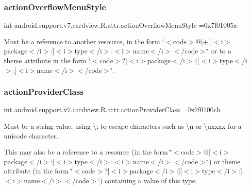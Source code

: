 \subsubsection{\texorpdfstring{action\+Overflow\+Menu\+Style}{actionOverflowMenuStyle}}
{\footnotesize\ttfamily int android.\+support.\+v7.\+cardview.\+R.\+attr.\+action\+Overflow\+Menu\+Style =0x7f01005a\hspace{0.3cm}{\ttfamily [static]}}

Must be a reference to another resource, in the form \char`\"{}$<$code$>$@\mbox{[}+\mbox{]}\mbox{[}$<$i$>$package$<$/i$>$\+:\mbox{]}$<$i$>$type$<$/i$>$\+:$<$i$>$name$<$/i$>$$<$/code$>$\char`\"{} or to a theme attribute in the form \char`\"{}$<$code$>$?\mbox{[}$<$i$>$package$<$/i$>$\+:\mbox{]}\mbox{[}$<$i$>$type$<$/i$>$\+:\mbox{]}$<$i$>$name$<$/i$>$$<$/code$>$\char`\"{}. \mbox{\label{classandroid_1_1support_1_1v7_1_1cardview_1_1R_1_1attr_a51040471b6842ab489279352458c9b21}} 
\subsubsection{\texorpdfstring{action\+Provider\+Class}{actionProviderClass}}
{\footnotesize\ttfamily int android.\+support.\+v7.\+cardview.\+R.\+attr.\+action\+Provider\+Class =0x7f0100cb\hspace{0.3cm}{\ttfamily [static]}}

Must be a string value, using \textquotesingle{}\textbackslash{};\textquotesingle{} to escape characters such as \textquotesingle{}\textbackslash{}n\textquotesingle{} or \textquotesingle{}\textbackslash{}uxxxx\textquotesingle{} for a unicode character. 

This may also be a reference to a resource (in the form \char`\"{}$<$code$>$@\mbox{[}$<$i$>$package$<$/i$>$\+:\mbox{]}$<$i$>$type$<$/i$>$\+:$<$i$>$name$<$/i$>$$<$/code$>$\char`\"{}) or theme attribute (in the form \char`\"{}$<$code$>$?\mbox{[}$<$i$>$package$<$/i$>$\+:\mbox{]}\mbox{[}$<$i$>$type$<$/i$>$\+:\mbox{]}$<$i$>$name$<$/i$>$$<$/code$>$\char`\"{}) containing a value of this type. \mbox{\label{classandroid_1_1support_1_1v7_1_1cardview_1_1R_1_1attr_ad68d1808a3fbd15f5824cff01263ba9e}} 
